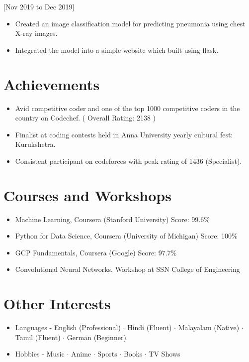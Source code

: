 \documentclass{article}
\begin{document}
[Nov 2019 to Dec 2019]
\begin{itemize}
\item Created an image classification model for predicting pneumonia using chest X-ray images.
\item Integrated the model into a simple website which built using flask.
\end{itemize}

\section{Achievements}
\begin{itemize}
\item Avid competitive coder and one of the top 1000 competitive coders in the country on Codechef. ( Overall Rating: 2138 ) 
\item Finalist at coding contests held in Anna University yearly cultural fest: Kurukshetra.
\item Consistent participant on codeforces with peak rating of 1436 (Specialist).
\end{itemize}

\section{Courses and Workshops}
\begin{itemize}
\item Machine Learning, Coursera (Stanford University) Score: 99.6\%
\item Python for Data Science, Coursera (University of Michigan) Score: 100\%
\item GCP Fundamentals, Coursera (Google) Score: 97.7\%
\item Convolutional Neural Networks, Workshop at SSN College of Engineering
\end{itemize}

\section{Other Interests}
\begin{itemize}
\item Languages - English (Professional) $\cdot$ Hindi (Fluent) $\cdot$ Malayalam (Native) $\cdot$ Tamil (Fluent) $\cdot$ German (Beginner)
\item Hobbies - Music $\cdot$ Anime $\cdot$ Sports $\cdot$ Books $\cdot$ TV Shows
\end{itemize}
\end{document}
